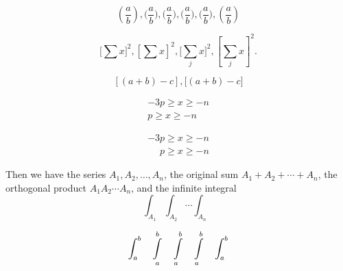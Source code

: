 \documentclass{article}
\newcommand{\fab}{\frac{a}{b}}
\begin{document}
\begin{equation*}
(\fab), \big(\fab\big),\Big(\fab\Big),\bigg(\fab\bigg),\Bigg(\fab\Bigg),\left(\fab\right)
\end{equation*}

\vskip 1cm

\begin{equation*}
\bigg[\sum x\bigg]^{2},
\left[\sum x \right]^{2},
\bigg[\sum_{j} x \bigg]^{2},
\left[\sum_{j} x \right]^{2}.
\end{equation*}

\vskip 1cm

\begin{equation*}
\left[(a+b)-c\right],\big[(a+b)-c\big]
\end{equation*}

\vskip 1cm

\begin{minipage}{0.45\textwidth}
\begin{gather*}
          -3p \geq x \geq -n\\
            p \geq x \geq -n
\end{gather*}
\end{minipage}
\hfil
\begin{minipage}{0.45\textwidth}
\begin{gather*}
          -3p \geq x \geq -n\\
\phantom{-3}p \geq x \geq -n
\end{gather*}
\end{minipage}

\vskip 1cm

Then we have the series $A_{1},A_{2},\dotsc,A_{n}$, the original sum $A_{1}+A_{2}+\dotsb+A_{n}$, the orthogonal product $A_{1} A_{2}\dotsm A_{n}$, and the infinite integral
\begin{equation*}
\int_{A_{1}}\int_{A_{2}} \dotsi \int_{A_{n}}
\end{equation*}

\vskip 1cm

\begin{equation*}
\int_{a}^{b}           \quad
\mathop{\int}_{a}^{b}  \quad
\int\limits_{a}^{b}    \quad
\intop_{a}^{b}         \quad
\intop\nolimits_{a}^{b}
\end{equation*}
\end{document}
